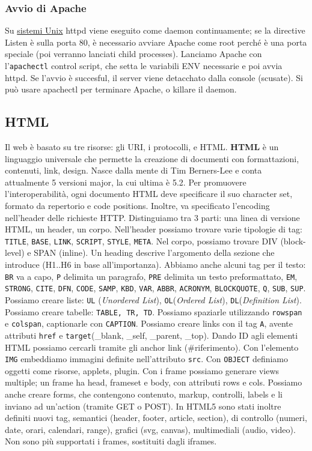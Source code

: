 \documentclass[11pt]{article}
\newcommand{\code}[1]{\texttt{#1}}
\begin{document}
\subsubsection{Avvio di Apache}
Su \href{https://www.youtube.com/watch?v=dFUlAQZB9Ng}{sistemi Unix} httpd viene eseguito come daemon continuamente; se la directive Listen è sulla porta 80, è necessario avviare Apache come root perché è una porta speciale (poi verranno lanciati child processes). Lanciamo Apache con l'\code{apachectl} control script, che setta le variabili ENV necessarie e poi avvia httpd. Se l'avvio è succesful, il server viene detacchato dalla console (scusate). Si può usare apachectl per terminare Apache, o killare il daemon.
\subsection{HTML}
Il web è basato su tre risorse: gli URI, i protocolli, e HTML. \textbf{HTML} è un linguaggio universale che permette la creazione di documenti con formattazioni, contenuti, link, design. Nasce dalla mente di Tim Berners-Lee e conta attualmente 5 versioni major, la cui ultima è 5.2. Per promuovere l'interoperabilità, ogni documento HTML deve specificare il suo character set, formato da repertorio e code positions. Inoltre, va specificato l'encoding nell'header delle richieste HTTP. Distinguiamo tra 3 parti: una linea di versione HTML, un header, un corpo. Nell'header possiamo trovare varie tipologie di tag: \code{TITLE}, \code{BASE}, \code{LINK}, \code{SCRIPT}, \code{STYLE}, \code{META}. Nel corpo, possiamo trovare DIV (block-level) e SPAN (inline). Un heading descrive l'argomento della sezione che introduce (H1..H6 in base all'importanza). Abbiamo anche alcuni tag per il testo: \code{BR} va a capo, \code{P} delimita un paragrafo, \code{PRE} delimita un testo preformattato, \code{EM}, \code{STRONG}, \code{CITE}, \code{DFN}, \code{CODE}, \code{SAMP}, \code{KBD}, \code{VAR}, \code{ABBR}, \code{ACRONYM}, \code{BLOCKQUOTE}, \code{Q}, \code{SUB}, \code{SUP}. Possiamo creare liste: \code{UL} (\textit{Unordered List}), \code{OL}(\textit{Ordered List}), \code{DL}(\textit{Definition List}). Possiamo creare tabelle: \code{TABLE, TR, TD}. Possiamo spaziarle utilizzando \code{rowspan} e \code{colspan}, captionarle con \code{CAPTION}. Possiamo creare links con il tag \code{A}, avente attributi \code{href} e \code{target}(\_blank, \_self, \_parent, \_top). Dando ID agli elementi HTML possiamo cercarli tramite gli anchor link (\#riferimento). Con l'elemento \code{IMG} embeddiamo immagini definite nell'attributo \code{src}. Con \code{OBJECT} definiamo oggetti come risorse, applets, plugin. Con i frame possiamo generare views multiple; un frame ha head, frameset e body, con attributi rows e cols. Possiamo anche creare forms, che contengono contenuto, markup, controlli, labels e li inviano ad un'action (tramite GET o POST). In HTML5 sono stati inoltre definiti nuovi tag, semantici (header, footer, article, section), di controllo (numeri, date, orari, calendari, range), grafici (svg, canvas), multimediali (audio, video). Non sono più supportati i frames, sostituiti dagli iframes.
\end{document}
